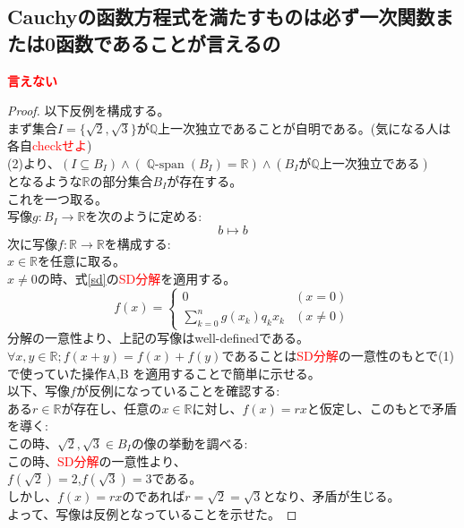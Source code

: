 \documentclass{jreport}
\DeclareMathOperator{\spn}{\mathbb{Q}-span}
\begin{document}
\subsection{Cauchyの函数方程式を満たすものは必ず一次関数または0函数であることが言えるの}
{\large \textcolor{red}{\textbf{言えない}}}
\begin{proof}
	以下反例を構成する。\\
	まず集合$I=\{\sqrt{2},\sqrt{3}\}$が$\mathbb{Q}$上一次独立であることが自明である。(気になる人は各自\textcolor{red}{checkせよ})\\
	(2)より、$(I\subseteq B_I)\land (\spn{(B_I)}=\mathbb{R}) \land (B_I \text{が} \mathbb{Q} \text{上一次独立である})$\\
	となるような$\mathbb{R}$の部分集合$B_I$が存在する。\\
	これを一つ取る。\\
	写像$g : B_I \to \mathbb{R}$を次のように定める:\\
	$$
		b \mapsto b
	$$
	次に写像$f: \mathbb{R} \to \mathbb{R}$を構成する:\\
	$x\in \mathbb{R}$を任意に取る。\\
	$x\neq 0$の時、式\ref{sd}の\textcolor{red}{SD分解}を適用する。
	\begin{equation}
		f(x)=
		\begin{cases}
			0 &(x=0)\\
			\sum\limits_{k=0}^{n}g(x_k)q_kx_k &(x \neq 0)
		\end{cases}
	\end{equation}
	分解の一意性より、上記の写像はwell-definedである。\\
	$\forall x,y \in \mathbb{R} ;f(x+y) =f(x)+f(y)$であることは\textcolor{red}{SD分解}の一意性のもとで(1)で使っていた操作A,B を適用することで簡単に示せる。\\
	以下、写像$f$が反例になっていることを確認する:\\
	ある$r \in \mathbb{R}$が存在し、任意の$x \in \mathbb{R}$に対し、$f(x) =rx$と仮定し、このもとで矛盾を導く:\\
	この時、$\sqrt{2},\sqrt{3} \in B_I$の像の挙動を調べる:\\
	この時、\textcolor{red}{SD分解}の一意性より、\\
	$f(\sqrt{2}) =2$,$f(\sqrt{3})=3$である。\\
	しかし、$f(x)=rx$のであれば$r=\sqrt{2} =\sqrt{3}$となり、矛盾が生じる。\\
	よって、写像は反例となっていることを示せた。
\end{proof}
\newpage
\end{document}
